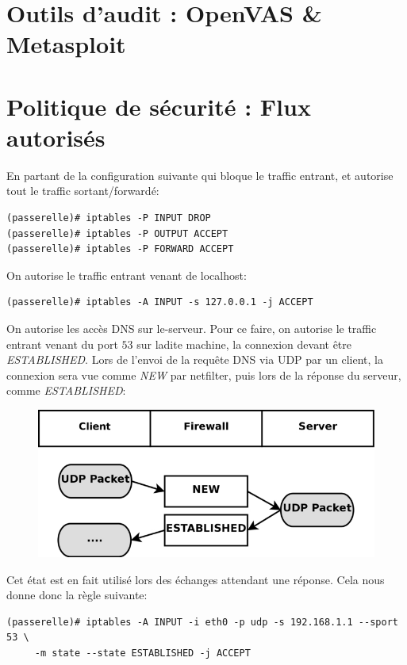 \documentclass[a4paper]{article}
\begin{document}
\section{Outils d'audit : OpenVAS \& Metasploit}

\section{Politique de sécurité : Flux autorisés}

En partant de la configuration suivante qui bloque le
traffic entrant, et autorise tout le traffic sortant/forwardé:
\begin{verbatim}
(passerelle)# iptables -P INPUT DROP
(passerelle)# iptables -P OUTPUT ACCEPT
(passerelle)# iptables -P FORWARD ACCEPT
\end{verbatim}

On autorise le traffic entrant venant de localhost:
\begin{verbatim}
(passerelle)# iptables -A INPUT -s 127.0.0.1 -j ACCEPT
\end{verbatim}

On autorise les accès DNS sur le-serveur. Pour ce faire,
on autorise le traffic entrant venant du port $53$ sur ladite
machine, la connexion devant être \textit{ESTABLISHED}. Lors
de l'envoi de la requête DNS via UDP par un client, la connexion
sera vue comme \textit{NEW} par netfilter, puis lors de la réponse
du serveur, comme \textit{ESTABLISHED}:
\begin{figure}[!ht]
	\centering
	\includegraphics[scale=.5]{state-udp-connection.png}
\end{figure}

Cet état est en fait utilisé lors des échanges attendant une réponse.
Cela nous donne donc la règle suivante:
\begin{verbatim}
(passerelle)# iptables -A INPUT -i eth0 -p udp -s 192.168.1.1 --sport 53 \
     -m state --state ESTABLISHED -j ACCEPT
\end{verbatim}
\end{document}
